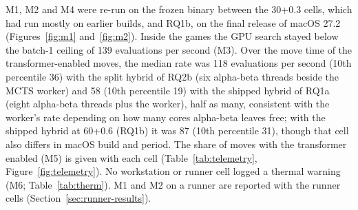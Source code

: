 \documentclass{article}
\begin{document}
M1, M2 and M4 were re-run on the frozen binary between the 30+0.3 cells, which had run mostly on earlier builds, and RQ1b, on the final release of macOS 27.2 (Figures~\ref{fig:m1} and~\ref{fig:m2}). Inside the games the GPU search stayed below the batch-1 ceiling of 139 evaluations per second (M3). Over the move time of the transformer-enabled moves, the median rate was 118 evaluations per second (10th percentile 36) with the split hybrid of RQ2b (six alpha-beta threads beside the MCTS worker) and 58 (10th percentile 19) with the shipped hybrid of RQ1a (eight alpha-beta threads plus the worker), half as many, consistent with the worker's rate depending on how many cores alpha-beta leaves free; with the shipped hybrid at 60+0.6 (RQ1b) it was 87 (10th percentile 31), though that cell also differs in macOS build and period. The share of moves with the transformer enabled (M5) is given with each cell (Table~\ref{tab:telemetry}, Figure~\ref{fig:telemetry}). No workstation or runner cell logged a thermal warning (M6; Table~\ref{tab:therm}). M1 and M2 on a runner are reported with the runner cells (Section~\ref{sec:runner-results}).
\end{document}
